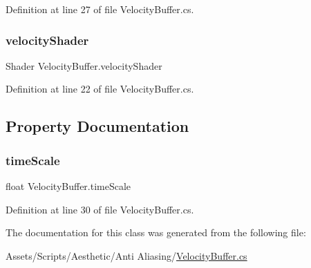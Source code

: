 Definition at line 27 of file Velocity\+Buffer.\+cs.

\mbox{\label{class_velocity_buffer_aa0c5457f2493cd8818284bd347df8675}} 
\subsubsection{\texorpdfstring{velocity\+Shader}{velocityShader}}
{\footnotesize\ttfamily Shader Velocity\+Buffer.\+velocity\+Shader}



Definition at line 22 of file Velocity\+Buffer.\+cs.



\subsection{Property Documentation}
\mbox{\label{class_velocity_buffer_aa49f68715d471f95a924c2072896cee2}} 
\subsubsection{\texorpdfstring{time\+Scale}{timeScale}}
{\footnotesize\ttfamily float Velocity\+Buffer.\+time\+Scale\hspace{0.3cm}{\ttfamily [get]}}



Definition at line 30 of file Velocity\+Buffer.\+cs.



The documentation for this class was generated from the following file\+:\begin{DoxyCompactItemize}
\item 
Assets/\+Scripts/\+Aesthetic/\+Anti Aliasing/\mbox{\hyperlink{_velocity_buffer_8cs}{Velocity\+Buffer.\+cs}}\end{DoxyCompactItemize}
